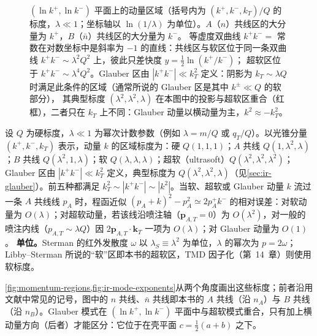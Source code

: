 \begin{figure}[htbp]
\caption{$(\ln k^+,\ln k^-)$ 平面上的动量区域（括号内为 $(k^+,k^-,k_T)/Q$ 的标度，$\lambda\ll1$；坐标轴以 $\ln(1/\lambda)$ 为单位）。$A$（$n$）共线区的大分量为 $k^+$，$B$（$\bar n$）共线区的大分量为 $k^-$。
等虚度双曲线 $k^+k^-=$ 常数在对数坐标中是斜率为 $-1$ 的直线：共线区与软区位于同一条双曲线 $k^+k^-\sim\lambda^2Q^2$ 上，彼此只差快度 $y=\frac12\ln(k^+/k^-)$；
超软区位于 $k^+k^-\sim\lambda^4Q^2$。Glauber 区由 $|k^+k^-|\ll k_T^2$ 定义：阴影为 $k_T\sim\lambda Q$ 时满足此条件的区域（通常所说的 Glauber 区是其中 $k^\pm\ll Q$ 的软部分），
其典型标度 $(\lambda^2,\lambda^2,\lambda)$ 在本图中的投影与超软区重合（红框），二者只在 $k_T$ 上不同：Glauber 动量以横动量为主，$k^2\approx-k_T^2$。}
\label{fig:momentum-regions}
\end{figure}

\begin{definition}[区域标度]\label{def:ir-scalings}
设 $Q$ 为硬标度，$\lambda\ll1$ 为幂次计数参数（例如 $\lambda=m/Q$ 或 $q_T/Q$）。以光锥分量 $(k^+,k^-,k_T)$ 表示，动量 $k$ 的区域标度为：硬 $Q(1,1,1)$；$A$ 共线 $Q(1,\lambda^2,\lambda)$；$B$ 共线 $Q(\lambda^2,1,\lambda)$；软 $Q(\lambda,\lambda,\lambda)$；超软（ultrasoft）$Q(\lambda^2,\lambda^2,\lambda^2)$；Glauber 区由 $|k^+k^-|\ll k_T^2$ 定义，典型标度为 $Q(\lambda^2,\lambda^2,\lambda)$（见\cref{sec:ir-glauber}）。前五种都满足 $k_T^2\sim|k^+k^-|\sim|k^2|$。当软、超软或 Glauber 动量 $k$ 流过一条 $A$ 共线线 $p_A$ 时，程函近似 $(p_A+k)^2-p_A^2\simeq2p_A^+k^-$ 的相对误差：对软动量为 $O(\lambda)$；对超软动量，若该线沿喷注轴（$\mathbf p_{A,T}=0$）为 $O(\lambda^2)$，对一般的喷注内线（$p_{A,T}\sim\lambda Q$）因 $2\mathbf p_{A,T}\cdot\mathbf k_T$ 一项为 $O(\lambda)$；对 Glauber 动量为 $O(1)$。
\textbf{单位。}Sterman 的红外发散度 $\omega$ 以 $\lambda_S\equiv\lambda^2$ 为单位，$\lambda$ 的幂次为 $p=2\omega$；Libby--Sterman 所说的“软”区即本书的超软区，TMD 因子化（第~14~章）则使用软标度。
\end{definition}

\cref{fig:momentum-regions,fig:ir-mode-exponents}从两个角度画出这些标度；前者沿用文献中常见的记号，图中的 $n$ 共线、$\bar n$ 共线即本书的 $A$ 共线（沿 $n_A$）与 $B$ 共线（沿 $n_B$）。Glauber 模式在 $(\ln k^+,\ln k^-)$ 平面中与超软模式重合，只有加上横动量方向（后者）才能区分：它位于在壳平面 $c=\frac12(a+b)$ 之下。

